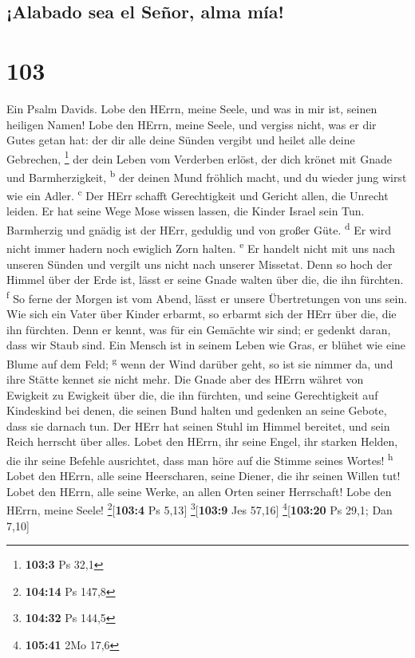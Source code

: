 \hypertarget{alabado-sea-el-seuxf1or-alma-muxeda}{%
\subsection{¡Alabado sea el Señor, alma
mía!}\label{alabado-sea-el-seuxf1or-alma-muxeda}}

\hypertarget{section-102}{%
\section{103}\label{section-102}}

 Ein Psalm Davids. Lobe den HErrn, meine Seele, und was in
mir ist, seinen heiligen Namen!  Lobe den HErrn, meine
Seele, und vergiss nicht, was er dir Gutes getan hat:  der
dir alle deine Sünden vergibt und heilet alle deine Gebrechen,
\footnote{\textbf{103:3} Ps 32,1}  der dein Leben vom
Verderben erlöst, der dich krönet mit Gnade und Barmherzigkeit,
\textsuperscript{b}  der deinen Mund fröhlich macht, und
du wieder jung wirst wie ein Adler. \textsuperscript{c} 
Der HErr schafft Gerechtigkeit und Gericht allen, die Unrecht leiden.
 Er hat seine Wege Mose wissen lassen, die Kinder Israel
sein Tun.  Barmherzig und gnädig ist der HErr, geduldig
und von großer Güte. \textsuperscript{d}  Er wird nicht
immer hadern noch ewiglich Zorn halten. \textsuperscript{e}
 Er handelt nicht mit uns nach unseren Sünden und vergilt
uns nicht nach unserer Missetat.  Denn so hoch der Himmel
über der Erde ist, lässt er seine Gnade walten über die, die ihn
fürchten. \textsuperscript{f}  So ferne der Morgen ist
vom Abend, lässt er unsere Übertretungen von uns sein. 
Wie sich ein Vater über Kinder erbarmt, so erbarmt sich der HErr über
die, die ihn fürchten.  Denn er kennt, was für ein
Gemächte wir sind; er gedenkt daran, dass wir Staub sind.
 Ein Mensch ist in seinem Leben wie Gras, er blühet wie
eine Blume auf dem Feld; \textsuperscript{g}  wenn der
Wind darüber geht, so ist sie nimmer da, und ihre Stätte kennet sie
nicht mehr.  Die Gnade aber des HErrn währet von Ewigkeit
zu Ewigkeit über die, die ihn fürchten, und seine Gerechtigkeit auf
Kindeskind  bei denen, die seinen Bund halten und
gedenken an seine Gebote, dass sie darnach tun.  Der HErr
hat seinen Stuhl im Himmel bereitet, und sein Reich herrscht über alles.
 Lobet den HErrn, ihr seine Engel, ihr starken Helden,
die ihr seine Befehle ausrichtet, dass man höre auf die Stimme seines
Wortes! \textsuperscript{h}  Lobet den HErrn, alle seine
Heerscharen, seine Diener, die ihr seinen Willen tut! 
Lobet den HErrn, alle seine Werke, an allen Orten seiner Herrschaft!
Lobe den HErrn, meine Seele! \footnote{\textbf{104:14} Ps 147,8}{[}\textbf{103:4}
Ps 5,13{]} \footnote{\textbf{104:32} Ps 144,5}{[}\textbf{103:9} Jes
57,16{]} \footnote{\textbf{105:41} 2Mo 17,6}{[}\textbf{103:20} Ps 29,1;
Dan 7,10{]}

